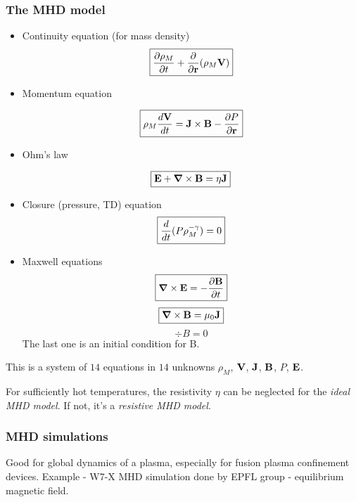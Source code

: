 \documentclass[PlasmaNotes.tex]{subfiles}
\begin{document}
\subsubsection{The MHD model}
\begin{itemize}
\item Continuity equation (for mass density)
\begin{equation}
\boxed{ \frac{\partial \rho_M}{\partial t} + \frac{\partial }{\partial \mathbf{r}}(\rho_M \mathbf{V})}
\end{equation}
\item Momentum equation

\begin{equation}
\boxed{ \rho_M \frac{d \mathbf{V}}{d t} = \mathbf{J} \times \mathbf{B} - \frac{\partial P}{\partial \mathbf{r}} }
\end{equation}
\item Ohm's law

\begin{equation}
\boxed{ \mathbf{E} + \mbox{\boldmath$ \nabla $} \times \mathbf{B} = \eta \mathbf{J} }
\end{equation}

\item Closure (pressure, TD) equation
\begin{equation}
\boxed{ \frac{d }{d t} (P \rho_M^{-\gamma})=0 }
\end{equation}

\item Maxwell equations
\begin{equation}
\boxed{  \mbox{\boldmath$ \nabla $} \times \mathbf{E} = -\frac{\partial \mathbf{B}}{\partial t} }
\end{equation}
\begin{equation}
\boxed{ \mbox{\boldmath$ \nabla $} \times \mathbf{B} = \mu_0 \mathbf{J} }
\end{equation}
\begin{equation}
\boxed{ \div{B} = 0 }
\end{equation}
The last one is an initial condition for B.
\end{itemize}

This is a system of $14$ equations in $14$ unknowns $\rho_M$, $\mathbf{V}$, $\mathbf{J}$, $\mathbf{B}$, $P$, $\mathbf{E}$.

For sufficiently hot temperatures, the resistivity $\eta$ can be neglected for the \emph{ideal MHD model}. If not, it's a \emph{resistive MHD model}.

\subsubsection{MHD simulations}

Good for global dynamics of a plasma, especially for fusion plasma confinement devices. Example - W7-X MHD simulation done by EPFL group - equilibrium magnetic field.
\end{document}
